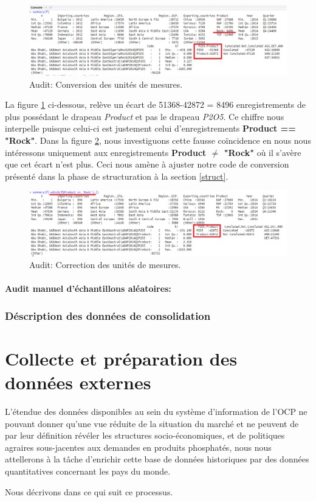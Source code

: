 		\begin{figure}[H]
		\centering
		\includegraphics[width=0.925\linewidth]{ch3-images/8}
		\caption{Audit: Conversion des unités de mesures.}
		\label{fig:diffprod}
		\end{figure}
		La figure \ref{fig:diffprod} ci-dessous, relève un écart de 51368-42872 = 8496 enregistrements de plus possédant le drapeau \textit{Product} et pas le drapeau \textit{P2O5}. Ce chiffre nous interpelle puisque celui-ci est justement celui d'enregistrements \textbf{Product == "Rock"}. Dans la figure \ref{fig:corrprod}, nous investiguons cette fausse coïncidence en nous nous intéressons uniquement aux enregistrements  \textbf{Product $\neq$ "Rock"} où il s'avère que cet écart n'est plus. Ceci nous amène à ajuster notre code de conversion présenté dans la phase de structuration à la section \ref{struct}.
		\begin{figure}[H]
		\centering
		\includegraphics[width=\linewidth]{ch3-images/8bis}
		\caption{Audit: Correction des unités de mesures.}
		\label{fig:corrprod}
		\end{figure}

	\paragraph{Audit manuel d'échantillons aléatoires:}
	\subsubsection{Déscription des données de consolidation}
	\section{Collecte et préparation des données externes}
	L'étendue des données disponibles au sein du système d'information de l'OCP ne pouvant donner qu'une vue réduite de la situation du marché et ne peuvent de par leur définition révéler les structures socio-économiques,  et de politiques agraires sous-jacentes aux demandes en produits phosphatés, nous nous attellerons à la tâche d'enrichir cette base de données historiques par des données quantitatives concernant les pays du monde.
	\par
	Nous décrivons dans ce qui suit ce processus. 
